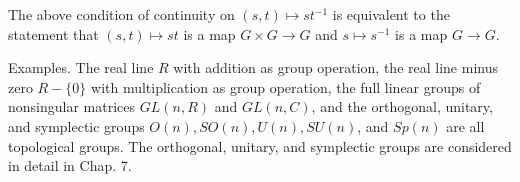 The above condition of continuity on $(s, t) \mapsto st^{-1}$ is equivalent to the statement that $(s, t) \mapsto st$ is a map $G \times G \rightarrow G$ and $s \mapsto s^{-1}$ is a map $G \rightarrow G$.

Examples. The real line $R$ with addition as group operation, the real line minus zero $R - \{0\}$ with multiplication as group operation, the full linear groups of nonsingular matrices $GL(n, R)$ and $GL(n, C)$, and the orthogonal, unitary, and symplectic groups $O(n), SO(n), U(n), SU(n)$, and $Sp(n)$ are all topological groups. The orthogonal, unitary, and symplectic groups are considered in detail in Chap. 7.
